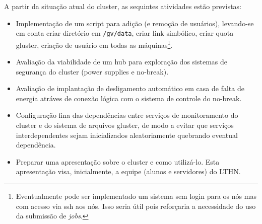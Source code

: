 A partir da situação atual do cluster, as sequintes atividades estão previstas:
\begin{itemize}
	\item[1] Implementação de um script para adição (e remoção de usuários), levando-se em conta criar diretório em \texttt{/gv/data}, criar link simbólico, criar quota gluster, criação de usuário em todas as máquinas\footnote{Eventualmente pode ser implementado um sistema sem login para os nós mas com acesso via ssh aos nós. Isso seria útil pois reforçaria a necessidade do uso da submissão de \textit{jobs}.}.
	\item[3] Avaliação da viabilidade de um hub para exploração dos sistemas de segurança do cluster (power supplies e no-break).
	\item[4] Avaliação de implantação de desligamento automático em casa de falta de energia atráves de conexão lógica com o sistema de controle do no-break.
	\item[5] Configuração fina das dependências entre serviços de monitoramento 
	do cluster e do sistema de arquivos gluster, de modo a evitar que serviços 
	interdependentes sejam inicializados aleatoriamente quebrando eventual 
	dependência.
	\item[6] Preparar uma apresentação sobre o cluster e como utilizá-lo. Esta apresentação visa, inicialmente, a equipe (alunos e servidores) do LTHN.
\end{itemize}

